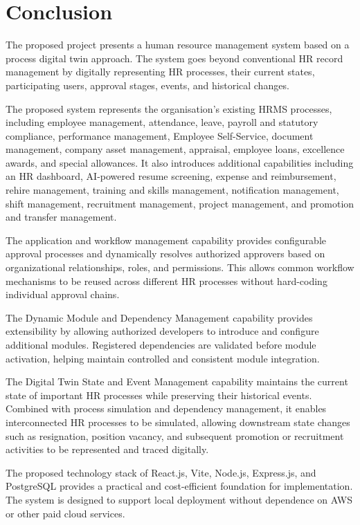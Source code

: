 \documentclass[12pt,a4paper]{article}
\begin{document}

\section{Conclusion}

The proposed project presents a human resource management system based on a process digital twin approach. The system goes beyond conventional HR record management by digitally representing HR processes, their current states, participating users, approval stages, events, and historical changes.

The proposed system represents the organisation's existing HRMS
processes, including employee management, attendance, leave, payroll
and statutory compliance, performance management, Employee
Self-Service, document management, company asset management,
appraisal, employee loans, excellence awards, and special allowances.
It also introduces additional capabilities including an HR
dashboard, AI-powered resume screening, expense and reimbursement,
rehire management, training and skills management, notification
management, shift management, recruitment management, project
management, and promotion and transfer management.

The application and workflow management capability provides
configurable approval processes and dynamically resolves
authorized approvers based on organizational relationships, roles,
and permissions. This allows common workflow mechanisms to be
reused across different HR processes without hard-coding individual
approval chains.

The Dynamic Module and Dependency Management capability provides
extensibility by allowing authorized developers to introduce and
configure additional modules. Registered dependencies are
validated before module activation, helping maintain controlled
and consistent module integration.

The Digital Twin State and Event Management capability maintains
the current state of important HR processes while preserving their
historical events. Combined with process simulation and dependency
management, it enables interconnected HR processes to be simulated,
allowing downstream state changes such as resignation, position
vacancy, and subsequent promotion or recruitment activities to be
represented and traced digitally.

The proposed technology stack of React.js, Vite, Node.js, Express.js,
and PostgreSQL provides a practical and cost-efficient
foundation for implementation. The system is designed to support
local deployment without dependence on AWS or other paid cloud
services.
\end{document}
